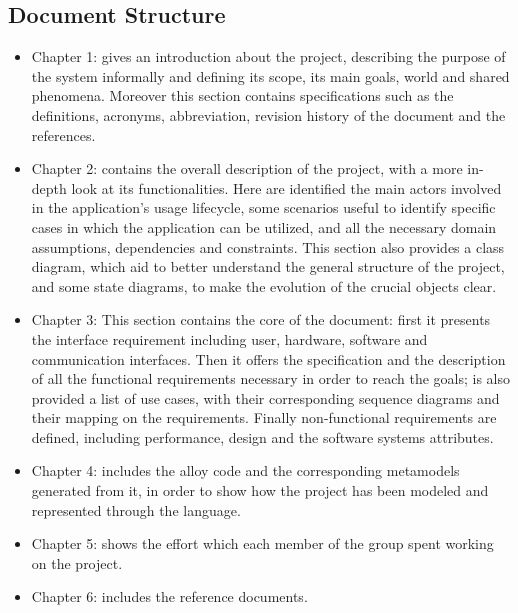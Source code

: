 \subsection{Document Structure}
\begin{itemize}
	\item Chapter 1: gives an introduction about the project, describing the purpose of the    system informally and defining its scope, its main goals, world and shared phenomena. Moreover this section contains specifications such as the definitions, acronyms, abbreviation,	revision history of the document and the references.
	\item Chapter 2: contains the overall description of the project, with a more in-depth look at its functionalities. Here are identified the main actors involved in the application’s usage lifecycle, some scenarios useful to identify specific cases in which the application can be utilized, and all the necessary domain assumptions, dependencies and constraints. This section also provides a class diagram, which aid to better understand the general structure of the project, and some state diagrams, to make the evolution of the crucial objects clear.
	\item Chapter 3: This section contains the core of the document: first it presents the interface requirement including user, hardware, software and communication interfaces.
	Then it offers the specification and the description of all the functional requirements necessary in order to reach the goals; is also provided a list of use cases, with their corresponding sequence diagrams and their mapping on the requirements.
	Finally non-functional requirements are defined, including performance, design and the software systems attributes.
	\item Chapter 4: includes the alloy code and the corresponding metamodels generated from it, in order to show how the project has been modeled and represented through the language.   
	\item Chapter 5: shows the effort which each member of the group spent working on the project.
	\item Chapter 6: includes the reference documents.
\end{itemize}

